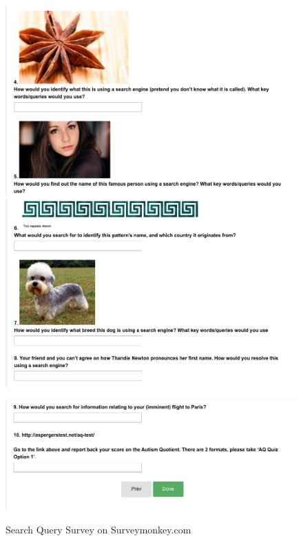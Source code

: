 \documentclass[a4paper, 11pt]{article}
\begin{document}
\begin{figure}[H]
\begin{center}
\includegraphics[scale=0.5]{survey5}\\
\includegraphics[scale=0.5]{survey6}\\
\end{center}
\end{figure}

\newpage
\begin{figure}[H]
\begin{center}
\includegraphics[scale=0.5]{survey7}\\
\caption{Search Query Survey on Surveymonkey.com \cite{surveymonkey}}
\end{center}
\end{figure}
\end{document}
